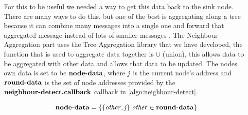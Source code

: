 For this to be useful we needed a way to get this data back to the sink node. There are many ways to do this, but one of the best is aggregating along a tree because it can combine many messages into a single one and forward that aggregated message instead of lots of smaller messages \cite{1628365}. The Neighbour Aggregation part uses the Tree Aggregation library that we have developed, the function that is used to aggregate data together is $\cup$ (union), this allows data to be aggregated with other data and allows that data to be updated. The nodes own data is set to be $\mbox{\textbf{node-data}}$, where $\mbox{\emph{j}}$ is the current node's address and $\mbox{\textbf{round-data}}$ is the set of node addresses provided by the $\mbox{\textbf{neighbour-detect.callback}}$ callback in \autoref{algo:neighbour-detect}.

\begin{equation}
\mbox{\textbf{node-data}} = \{\{\mbox{\emph{other}}, \mbox{\emph{j}}\} | \mbox{\emph{other}} \in \mbox{\textbf{round-data}} \}
\end{equation}

